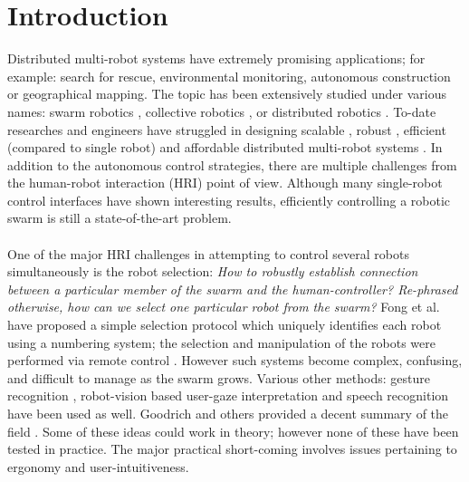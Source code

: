 \documentclass{svmult}
\begin{document}

\section{Introduction}
\label{sec:introduction}
Distributed multi-robot systems have extremely promising applications; for example: search for rescue, environmental monitoring, autonomous construction or geographical mapping. The topic has been extensively studied under various names: swarm robotics \cite{brambilla2013}, collective robotics \cite{kernbach2013handbook}, or distributed robotics \cite{martinoli2012distributed}. To-date researches and engineers have struggled in designing scalable \cite{rubenstein2012kilobot}, robust \cite{winfield2006safety}, efficient (compared to single robot) \cite{Bonani2012} and affordable distributed multi-robot systems \cite{rubenstein2014programmable}. In addition to the autonomous control strategies, there are multiple challenges from the human-robot interaction (HRI) point of view. Although many single-robot control interfaces have shown interesting results, efficiently controlling a robotic swarm is still a state-of-the-art problem.\\
\\
One of the major HRI challenges in attempting to control several robots simultaneously is the robot selection: \textit{How to robustly establish connection between a particular member of the swarm and the human-controller? Re-phrased otherwise, how can we select one particular robot from the swarm?} Fong et al. have proposed a simple selection protocol which uniquely identifies each robot using a numbering system; the selection and manipulation of the robots were performed via remote control \cite{fong2003}. However such systems become complex, confusing, and difficult to manage as the swarm grows. Various other methods: gesture recognition \cite{Nagietal2014, Jones2010, Couture-Beil2010, Monajjemi2013}, robot-vision based user-gaze interpretation \cite{Couture-Beil2010, Monajjemi2013, Pourmehr2013} and speech recognition \cite{Pourmehr2013} have been used as well. Goodrich and others provided a decent summary of the field \cite{yanco2004classifying, goodrich2007human, Rule2012}. Some of these ideas could work in theory; however none of these have been tested in practice. The major practical short-coming involves issues pertaining to ergonomy and user-intuitiveness. \\
\\ 
\end{document}
